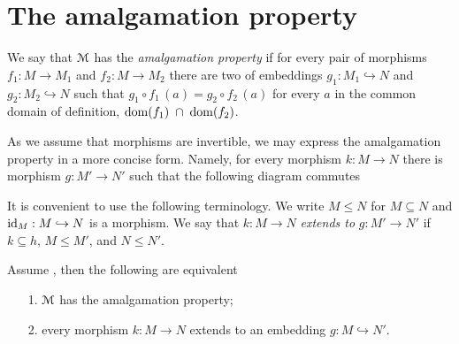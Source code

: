 \documentclass[creche.tex]{subfiles}
\begin{document}
\section{The amalgamation property}

We say that $\EuScript M$ has the \emph{amalgamation property\/} if for every pair of morphisms $f_1:M\to M_1$ and $f_2:M\to M_2$ there are two of embeddings $g_1:M_1\hookrightarrow N$ and $g_2:M_2\hookrightarrow N$ such that $g_1\circ f_1\, (a) = g_2\circ f_2\, (a)$ for every $a$ in the common domain of definition, $\mathop{\rm dom} (f_1)\; \cap\; \mathop{\rm dom} (f_2)$.


\hfil{}

As we assume that morphisms are invertible, we may express the amalgamation property in a more concise form. Namely, for every morphism $k:M\to N$ there is morphism  $g:M'\to N'$ such that the following diagram commutes

\hfil{}

It is convenient to use the following terminology. We write \emph{$M\le N$\/} for $M\subseteq N$ and $\textrm{id}_M:M\hookrightarrow N$ is a morphism. We say that $k:M\to N$ \emph{extends to\/} $g:M'\to N'$ if $k\subseteq h$, $M\le M'$, and  $N\le N'$.


\begin{proposition}
Assume , then the following are equivalent
\begin{itemize}
\item[1.] $\EuScript M$ has the amalgamation property;
\item[2.] every morphism $k:M\to N$ extends to an embedding $g : M\hookrightarrow N'$.

\end{itemize}
\end{proposition}
\end{document}
